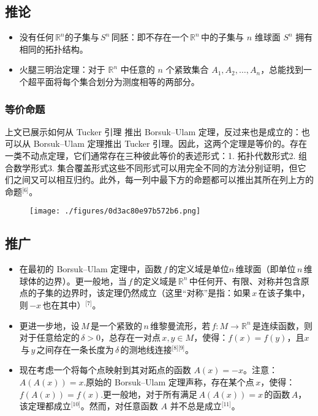 \subsection{推论}
\begin{itemize}
\item 没有任何 $\mathbb{R}^n$的子集与 $S^n$ 同胚：即不存在一个 $\mathbb{R}^n$ 中的子集与 $n$ 维球面 $S^n$ 拥有相同的拓扑结构。
\item 火腿三明治定理：对于 $\mathbb{R}^n$ 中任意的 $n$ 个紧致集合 $A_1, A_2, \dots, A_n$，总能找到一个超平面将每个集合划分为测度相等的两部分。
\end{itemize}
\subsubsection{等价命题}
上文已展示如何从 Tucker 引理 推出 Borsuk–Ulam 定理，反过来也是成立的：也可以从 Borsuk–Ulam 定理推出 Tucker 引理。因此，这两个定理是等价的。存在一类不动点定理，它们通常存在三种彼此等价的表述形式：1. 拓扑代数形式2. 组合数学形式3. 集合覆盖形式这些不同形式可以用完全不同的方法分别证明，但它们之间又可以相互归约。此外，每一列中最下方的命题都可以推出其所在列上方的命题\(^\text{[6]}\)。
\begin{figure}[ht]
\centering
\texttt{[image: ./figures/0d3ac80e97b572b6.png]}
\caption{} \label{fig_BSKwlm_1}
\end{figure}
\subsection{推广}
\begin{itemize}
\item 在最初的 Borsuk–Ulam 定理中，函数 $f$ 的定义域是单位$n$ 维球面（即单位 $n$ 维球体的边界）。更一般地，当 $f$ 的定义域是 $\mathbb{R}^n$ 中任何开、有限、对称并包含原点的子集的边界时，该定理仍然成立（这里“对称”是指：如果 $x$ 在该子集中，则 $-x$ 也在其中）\(^\text{[7]}\)。
\item 更进一步地，设 $M$ 是一个紧致的 $n$ 维黎曼流形，若 $f: M \rightarrow \mathbb{R}^n$ 是连续函数，则对于任意给定的 $\delta > 0$，总存在一对点 $x, y \in M$，使得：$f(x) = f(y)$，且$x$ 与 $y$ 之间存在一条长度为 $\delta$ 的测地线连接\(^\text{[8][9]}\)。
\item 现在考虑一个将每个点映射到其对跖点的函数 $A(x) = -x$。注意：$A(A(x)) = x.$原始的 Borsuk–Ulam 定理声称，存在某个点 $x$，使得：$f(A(x)) = f(x).$更一般地，对于所有满足 $A(A(x)) = x$ 的函数 $A$，该定理都成立\(^\text{[10]}\)。然而，对任意函数 $A$ 并不总是成立\(^\text{[11]}\)。
\end{itemize}
